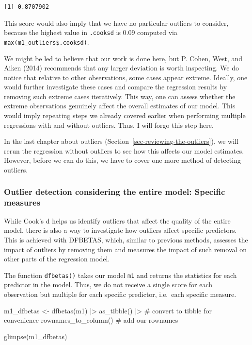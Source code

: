 \documentclass[
  letterpaper,
  DIV=11,
  numbers=noendperiod]{scrreprt}
\newenvironment{Shaded}{\begin{snugshade}}{\end{snugshade}}
\newcommand{\CommentTok}[1]{\textcolor[rgb]{0.37,0.37,0.37}{#1}}
\newcommand{\FunctionTok}[1]{\textcolor[rgb]{0.28,0.35,0.67}{#1}}
\newcommand{\NormalTok}[1]{\textcolor[rgb]{0.00,0.23,0.31}{#1}}
\newcommand{\OtherTok}[1]{\textcolor[rgb]{0.00,0.23,0.31}{#1}}
\newcommand{\SpecialCharTok}[1]{\textcolor[rgb]{0.37,0.37,0.37}{#1}}
\begin{document}
\begin{verbatim}
[1] 0.8707902
\end{verbatim}

This score would also imply that we have no particular outliers to
consider, because the highest value in \texttt{.cooksd} is 0.09 computed
via \texttt{max(m1\_outliers\$.cooksd)}.

We might be led to believe that our work is done here, but P. Cohen,
West, and Aiken (2014) recommends that any larger deviation is worth
inspecting. We do notice that relative to other observations, some cases
appear extreme. Ideally, one would further investigate these cases and
compare the regression results by removing such extreme cases
iteratively. This way, one can assess whether the extreme observations
genuinely affect the overall estimates of our model. This would imply
repeating steps we already covered earlier when performing multiple
regressions with and without outliers. Thus, I will forgo this step
here.

In the last chapter about outliers
(Section~\ref{sec-reviewing-the-outliers}), we will rerun the regression
without outliers to see how this affects our model estimates. However,
before we can do this, we have to cover one more method of detecting
outliers.

\subsubsection{Outlier detection considering the entire model: Specific
measures}\label{sec-outlier-detection-specific-measures}

While Cook's d helps us identify outliers that affect the quality of the
entire model, there is also a way to investigate how outliers affect
specific predictors. This is achieved with DFBETAS, which, similar to
previous methods, assesses the impact of outliers by removing them and
measures the impact of such removal on other parts of the regression
model.

The function \texttt{dfbetas()} takes our model \texttt{m1} and returns
the statistics for each predictor in the model. Thus, we do not receive
a single score for each observation but multiple for each specific
predictor, i.e.~each specific measure.

\begin{Shaded}
\begin{Highlighting}[]
\NormalTok{m1\_dfbetas }\OtherTok{\textless{}{-}}
  \FunctionTok{dfbetas}\NormalTok{(m1) }\SpecialCharTok{|\textgreater{}}
  \FunctionTok{as\_tibble}\NormalTok{() }\SpecialCharTok{|\textgreater{}}               \CommentTok{\# convert to tibble for convenience}
  \FunctionTok{rownames\_to\_column}\NormalTok{()          }\CommentTok{\# add our rownames}

\FunctionTok{glimpse}\NormalTok{(m1\_dfbetas)}
\end{Highlighting}
\end{Shaded}
\end{document}
